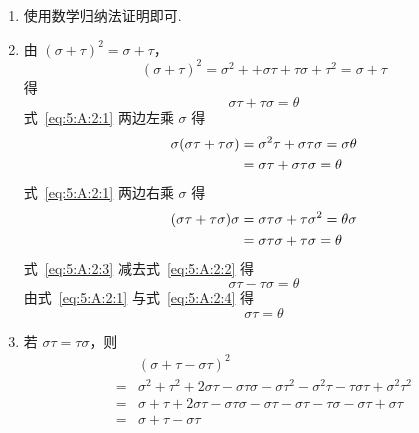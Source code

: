 \documentclass[UTF8,12pt,a4paper,fontset=fandol]{ctexart}
\begin{document}
\begin{solve}
\begin{enumerate}
                \item 使用数学归纳法证明即可.

                \item 由 $ (\sigma + \tau)^2 = \sigma + \tau $，
                      \[ (\sigma + \tau)^2 = \sigma^2 + + \sigma \tau + \tau \sigma + \tau^2 = \sigma + \tau \]
                      得
                      \begin{equation} \label{eq:5:A:2:1}
                          \sigma \tau + \tau \sigma = \theta
                      \end{equation}
                      式~\eqref{eq:5:A:2:1} 两边左乘 $ \sigma $ 得
                      \begin{align}
                          \sigma(\sigma \tau + \tau \sigma) & = \sigma^2 \tau + \sigma \tau \sigma = \sigma \theta \notag    \\
                                                            & = \sigma \tau + \sigma \tau \sigma = \theta \label{eq:5:A:2:2}
                      \end{align}
                      式~\eqref{eq:5:A:2:1} 两边右乘 $ \sigma $ 得
                      \begin{align}
                          (\sigma \tau + \tau \sigma)\sigma & = \sigma \tau \sigma + \tau \sigma^2 = \theta \sigma \notag    \\
                                                            & = \sigma \tau \sigma + \tau \sigma = \theta \label{eq:5:A:2:3}
                      \end{align}
                      式~\eqref{eq:5:A:2:3} 减去式~\eqref{eq:5:A:2:2} 得
                      \begin{equation}
                          \sigma \tau - \tau \sigma = \theta \label{eq:5:A:2:4}
                      \end{equation}
                      由式~\eqref{eq:5:A:2:1} 与式~\eqref{eq:5:A:2:4} 得
                      \[ \sigma \tau = \theta \]

                \item 若 $ \sigma \tau = \tau \sigma $，则
                      \begin{align*}
                              & (\sigma + \tau - \sigma \tau)^2                                                                                             \\
                          ={} & \sigma^2 + \tau^2 + 2 \sigma \tau - \sigma \tau \sigma - \sigma \tau^2 - \sigma^2 \tau - \tau \sigma \tau + \sigma^2 \tau^2 \\
                          ={} & \sigma + \tau + 2 \sigma \tau - \sigma \tau \sigma - \sigma \tau - \sigma \tau - \tau \sigma - \sigma \tau + \sigma \tau    \\
                          ={} & \sigma + \tau - \sigma \tau
                      \end{align*}
            \end{enumerate}
\end{solve}
\end{document}
